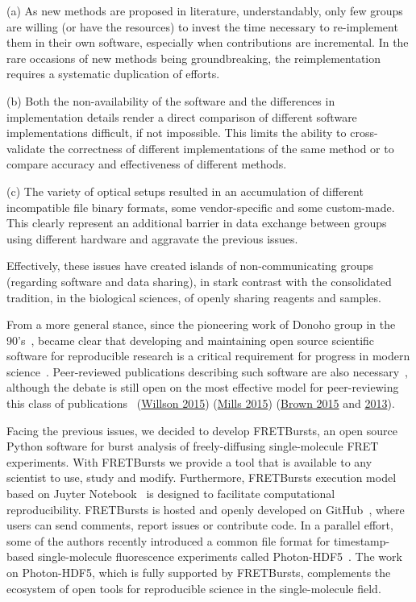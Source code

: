 (a) As new methods are proposed in literature, understandably, only few 
groups are willing (or have the resources) to invest the time necessary to 
re-implement them in their own software, especially when contributions are incremental. 
In the rare occasions of new methods being groundbreaking, the reimplementation 
requires a systematic duplication of efforts. 

(b) Both the non-availability of the software and the differences in implementation 
details render a direct comparison of different software implementations difficult, 
if not impossible. 
This limits the ability to cross-validate the correctness of different 
implementations of the same method or to compare accuracy and effectiveness
of different methods.

(c) The variety of optical setups resulted in an accumulation of different
incompatible file binary formats, some vendor-specific and some custom-made. 
This clearly represent an additional barrier in data exchange between 
groups using different hardware and aggravate the previous issues.

Effectively, these issues have created islands of non-communicating groups 
(regarding software and data sharing), in stark contrast 
with the consolidated tradition, in the biological sciences, of openly 
sharing reagents and samples.

From a more general stance, since the pioneering work of Donoho group in the 90's~\cite{Buckheit_1995}, 
became clear that developing and maintaining open source scientific software
for reproducible research is a critical requirement for progress in modern 
science~\cite{Ince_2012,Vihinen_2015}. Peer-reviewed publications describing such software are also necessary~\cite{Pradal_2013}, 
although the debate is still open on the most effective model for peer-reviewing this
class of publications~\cite{Check_Hayden_2013,Check_Hayden_2015} 
(\href{https://software-carpentry.org/blog/2015/04/quality-is-free-getting-there-isnt.html}{Willson 2015})
(\href{http://https://www.mozillascience.org/effective-code-review-for-journals}{Mills 2015})
(\href{http://http://ivory.idyll.org/blog/2015-we-live-in-a-bubble.html}{Brown 2015} and \href{http://http://ivory.idyll.org/blog/on-code-review-of-scientific-code.html}{2013}).

Facing the previous issues, we decided to develop FRETBursts, 
an open source Python software for burst analysis of freely-diffusing
single-molecule FRET experiments. 
With FRETBursts we provide a tool that is available to any scientist
to use, study and modify. Furthermore, FRETBursts execution model 
based on Juyter Notebook~\cite{Shen_2014} is designed to facilitate 
computational reproducibility. 
FRETBursts is hosted and openly developed on GitHub~\cite{Blischak_2016,Prli__2012}, 
where users can send comments, report issues or contribute code.
In a parallel effort, some of the authors recently introduced a common
file format for timestamp-based single-molecule fluorescence experiments
called Photon-HDF5~\cite{Ingargiola2016}. The work on Photon-HDF5,
which is fully supported by FRETBursts, complements the ecosystem
of open tools for reproducible science in the single-molecule field.

